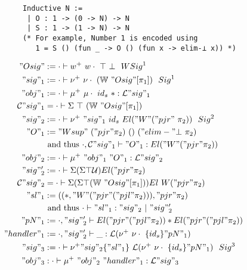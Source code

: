 \begin{figure}
  \begin{minipage}{\linewidth}
    \begin{verbatim}
      Inductive N :=
       | O : 1 -> (0 -> N) -> N 
       | S : 1 -> (1 -> N) -> N
      (* For example, Number 1 is encoded using
         1 = S () (fun _ -> O () (fun x -> elim-⊥ x)) *)
    \end{verbatim}
  \end{minipage}

  \begin{minipage}[t]{0.4\linewidth}
\begin{align*}
  "Osig" &:= \goodWSig{\cdot}{w^+\ w\cdot\ \top\ \bot}{1} \\
  "sig"_1 &:= \goodSig{\cdot}{\nu^+ \ \nu\cdot  \ (\bW \ "Osig"[\pi_1])}{1}  \\
  "obj"_1 &:= \goodTerm{\cdot}{\mu^+ \ \mu\cdot \ {id_s} \ *}{\cL"sig"_1}\\
  \cC"sig"_1 &= \goodType{\cdot}{\Sigma \ \top \ (\bW \ "Osig"[\pi_1]) }{} \\
  "sig"_2 &:=  \goodSig{\cdot}{\nu^+ \ "sig"_1 \ {id_s} \ El ("W" ("pjr" \ \pi_2))}{2} \\ 
  "O"_1 &:= {"Wsup" \ ("pjr" \pi_2) \ () \ ("elim-"\bot \ \pi_2)}  \\ 
  & \text{ and thus }  \goodTerm{\cdot, \cC"sig"_1}{"O"_1}{El ("W" ("pjr" \pi_2))} \\
  "obj"_2 &:= \goodTerm{\cdot}{\mu^+ \ "obj"_1 \ "O"_1}{\cL"sig"_2} \\
  "sig"_2' &:= \goodType{\cdot}{\Sigma (\Sigma \top \cU)El ("pjr" \pi_2)}{} \\ 
  \cC"sig"_2 &= \goodType{\cdot}{\Sigma (\Sigma \top (\bW \ "Osig"[\pi_1]))El \ W("pjr" \pi_2) }{} \\ 
  "sl"_1 &:= ((*, "W" ("pjr" ("pjl" \pi_2)) ), "pjr" \pi_2) \\ 
  & \text{ and thus }  \goodSeal{\cdot}{"sl"_1}{"sig"_2}{"sig"_2'} \\
  "pN"_1 &:= \goodType{\cdot, "sig"_2'}{El ("pjr" ("pjl" \pi_2)) * El ("pjr" ("pjl" \pi_2))}{} \\
  "handler"_1 & := \goodTerm{\cdot, "sig"_2'}{\_}{\cL(\nu^+ \ \nu\cdot \ \{id_s\} "pN"_1)} \\
  "sig"_3 &:= \goodSig{\cdot}{\nu^+ "sig"_2 \{"sl"_1\} \ \cL(\nu^+ \ \nu\cdot \ \{id_s\} "pN"_1)}{3} \\ 
  "obj"_3 &: \goodTerm{\cdot}{\mu^+~"obj"_2~"handler"_1}{\cL"sig"_3}\\

\end{align*}
\end{minipage}
\end{figure}
